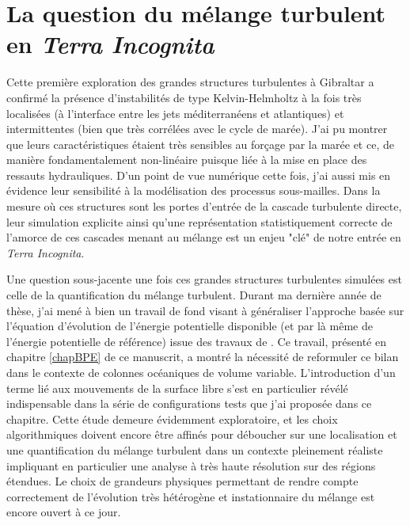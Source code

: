 \section{La question du mélange turbulent en \textit{Terra Incognita}}
Cette première exploration des grandes structures turbulentes à Gibraltar a confirmé la présence d'instabilités de type Kelvin-Helmholtz à la fois très localisées (à l'interface entre les jets méditerranéens et atlantiques) et intermittentes (bien que très corrélées avec le cycle de marée). J'ai pu montrer que leurs caractéristiques étaient très sensibles au forçage par la marée et ce, de manière fondamentalement non-linéaire puisque liée à la mise en place des ressauts hydrauliques. D'un point de vue numérique cette fois, j'ai aussi mis en évidence leur sensibilité à la modélisation des processus sous-mailles.
Dans la mesure où ces structures sont les portes d'entrée de la cascade turbulente directe, leur simulation explicite ainsi qu'une représentation statistiquement correcte de l'amorce de ces cascades menant au mélange est un enjeu "clé" de notre entrée en \textit{Terra Incognita}.


Une question sous-jacente une fois ces grandes structures turbulentes simulées est celle de la quantification du mélange turbulent. Durant ma dernière année de thèse, j'ai mené à bien un travail de fond visant à généraliser l'approche basée sur l'équation d'évolution de l'énergie potentielle disponible (et par là même de l'énergie potentielle de référence) issue des travaux de \cite{lorenz_available_1955}. Ce travail, présenté en chapitre \ref{chapBPE} de ce manuscrit, a montré la nécessité de reformuler ce bilan dans le contexte de colonnes océaniques de volume variable. L'introduction d'un terme lié aux mouvements de la surface libre s'est en particulier révélé indispensable dans la série de configurations tests que j'ai proposée dans ce chapitre. %
Cette étude demeure évidemment exploratoire, et les choix algorithmiques doivent encore être affinés pour déboucher sur une localisation et une quantification du mélange turbulent dans un contexte pleinement réaliste impliquant en particulier une analyse à très haute résolution sur des régions étendues. Le choix de grandeurs physiques permettant de rendre compte correctement de l'évolution très hétérogène et instationnaire du mélange est encore ouvert à ce jour.

